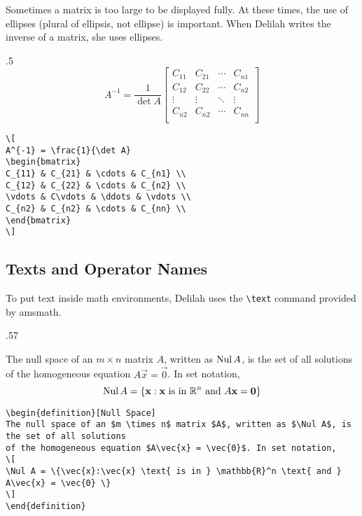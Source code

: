 Sometimes a matrix is too large to be displayed fully. At these times, the use of ellipses (plural of ellipsis, not ellipse) is important. When Delilah writes the inverse of a matrix, she uses ellipses.
\begin{miniexammar}{.5\textandmarginlen}{
\[
A^{-1} = \frac{1}{\det A}
\begin{bmatrix}
C_{11} & C_{21} & \cdots & C_{n1} \\
C_{12} & C_{22} & \cdots & C_{n2} \\
\vdots & \vdots & \ddots & \vdots \\
C_{n2} & C_{n2} & \cdots & C_{nn} \\
\end{bmatrix}
\]
}
\begin{lstlisting}
\[
A^{-1} = \frac{1}{\det A}
\begin{bmatrix}
C_{11} & C_{21} & \cdots & C_{n1} \\
C_{12} & C_{22} & \cdots & C_{n2} \\
\vdots & C\vdots & \ddots & \vdots \\
C_{n2} & C_{n2} & \cdots & C_{nn} \\
\end{bmatrix}
\]
\end{lstlisting}
\end{miniexammar}

\subsection{Texts and Operator Names}
To put text inside math environments, Delilah uses the \verb=\text= command provided by amsmath.
\begin{miniexammar}{.57\textandmarginlen}{
\begin{definition}
The null space of an $m \times n$ matrix $A$, written as $\operatorname{Nul} A$, is the set of all solutions
of the homogeneous equation $A\vec{x} = \vec{0}$. In set notation,
\[
\operatorname{Nul} A = \{\mathbf{x}:\mathbf{x} \text{ is in } \mathbb{R}^n \text{ and } A\mathbf{x} = \mathbf{0} \}
\]
\end{definition}
}
\begin{lstlisting}
\begin{definition}[Null Space]
The null space of an $m \times n$ matrix $A$, written as $\Nul A$, is the set of all solutions
of the homogeneous equation $A\vec{x} = \vec{0}$. In set notation,
\[
\Nul A = \{\vec{x}:\vec{x} \text{ is in } \mathbb{R}^n \text{ and } A\vec{x} = \vec{0} \}
\]
\end{definition}
\end{lstlisting}
\end{miniexammar}

